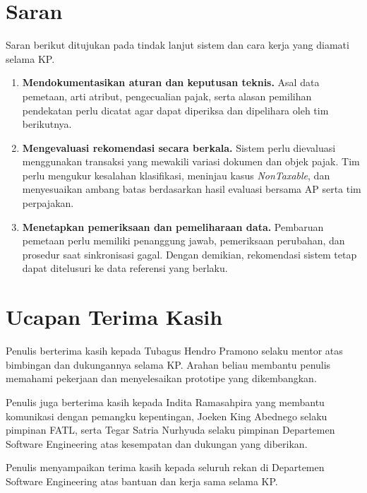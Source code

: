\section{Saran}
Saran berikut ditujukan pada tindak lanjut sistem dan cara kerja yang diamati selama KP.
\begin{enumerate}
    \item \textbf{Mendokumentasikan aturan dan keputusan teknis.} Asal data pemetaan, arti atribut, pengecualian pajak, serta alasan pemilihan pendekatan perlu dicatat agar dapat diperiksa dan dipelihara oleh tim berikutnya.

    \item \textbf{Mengevaluasi rekomendasi secara berkala.} Sistem perlu dievaluasi menggunakan transaksi yang mewakili variasi dokumen dan objek pajak. Tim perlu mengukur kesalahan klasifikasi, meninjau kasus \textit{NonTaxable}, dan menyesuaikan ambang batas berdasarkan hasil evaluasi bersama AP serta tim perpajakan.

    \item \textbf{Menetapkan pemeriksaan dan pemeliharaan data.} Pembaruan pemetaan perlu memiliki penanggung jawab, pemeriksaan perubahan, dan prosedur saat sinkronisasi gagal. Dengan demikian, rekomendasi sistem tetap dapat ditelusuri ke data referensi yang berlaku.
\end{enumerate}

\section{Ucapan Terima Kasih}
Penulis berterima kasih kepada Tubagus Hendro Pramono selaku mentor atas bimbingan dan dukungannya selama KP. Arahan beliau membantu penulis memahami pekerjaan dan menyelesaikan prototipe yang dikembangkan.

Penulis juga berterima kasih kepada Indita Ramasahpira yang membantu komunikasi dengan pemangku kepentingan, Joeken King Abednego selaku pimpinan FATL, serta Tegar Satria Nurhyuda selaku pimpinan Departemen Software Engineering atas kesempatan dan dukungan yang diberikan.

Penulis menyampaikan terima kasih kepada seluruh rekan di Departemen Software Engineering atas bantuan dan kerja sama selama KP.
